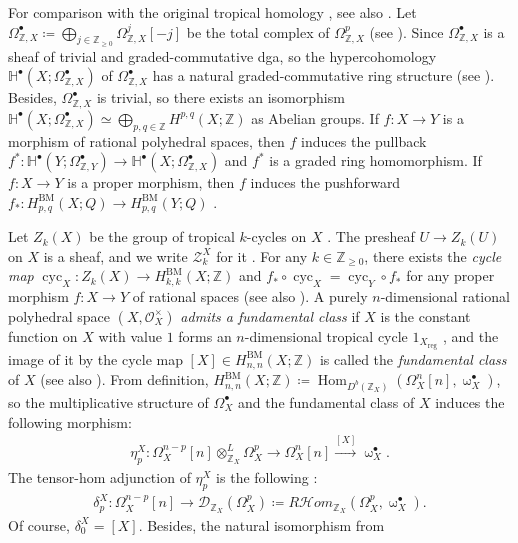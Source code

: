 \documentclass[a4paper,dvipdfmx,reqno,12pt]{amsart}
\theoremstyle{definition}
\newcommand{\deq}{\coloneqq}
\newcommand{\opn}[1]{\operatorname{#1}}
\newcommand{\xto}[1]{\xrightarrow{#1}}
\numberwithin{equation}{section}
\begin{document}
For comparison with the original
tropical homology \cite{MR3330789,MR3961331},
see also \cite[Remark 2.8 and Theorem 4.20]{MR4637248}.
Let $\Omega_{\mathbb{Z},X}^{\bullet}
\deq \bigoplus_{j\in \mathbb{Z}_{\geq 0}}
\Omega_{\mathbb{Z},X}^{j}[-j]$ 
be the total complex of 
$\Omega_{\mathbb{Z},X}^{p}$ 
(see \cite[Proposition 3.1]{smacka2017differential}).
Since $\Omega_{\mathbb{Z},X}^{\bullet}$ is a sheaf
of trivial and graded-commutative dga, so the
hypercohomology 
$\mathbb{H}^{\bullet}(X;\Omega_{\mathbb{Z},X}^{\bullet})$
of $\Omega_{\mathbb{Z},X}^{\bullet}$ has
a natural graded-commutative ring structure
(see \cite[Remark 21.130]{gortzwedhorn2023}).
Besides, $\Omega_{\mathbb{Z},X}^{\bullet}$ is trivial,
so there exists an isomorphism
$\mathbb{H}^{\bullet}(X;\Omega_{\mathbb{Z},X}^{\bullet})
\simeq \bigoplus_{p,q\in \mathbb{Z}}
H^{p,q}(X;\mathbb{Z})$ as Abelian groups.
If $f\colon X\to Y$ is a morphism of
rational polyhedral spaces, then
$f$ induces the pullback
$f^{*}\colon \mathbb{H}^{\bullet}(Y;\Omega_{\mathbb{Z},Y}^{\bullet})
\to \mathbb{H}^{\bullet}(X;\Omega_{\mathbb{Z},X}^{\bullet})$
\cite[Proposition 4.18]{MR4637248} and $f^{*}$ is
a graded ring homomorphism.
If $f\colon X\to Y$ is a proper morphism, then
$f$ induces the pushforward 
$f_*\colon H^{\opn{BM}}_{p,q}(X;Q)\to 
H^{\opn{BM}}_{p,q}(Y;Q)$ \cite[Definition 4.9]{MR4637248}.

Let $Z_k(X)$ be the group of tropical $k$-cycles
on $X$ \cite[Definition 3.5]{MR4637248}.
The presheaf $U\to Z_k(U)$ on $X$ is a sheaf,
and we write $\mathscr{Z}_k^{X}$ for it
\cite[p.591]{MR4637248}.
For any $k\in \mathbb{Z}_{\geq 0}$, there
exists the \emph{cycle map}
$\opn{cyc}_X \colon Z_k(X)\to 
H^{\mathrm{BM}}_{k,k}(X;\mathbb{Z})$
and $f_*\circ \opn{cyc}_X=\opn{cyc}_Y \circ f_*$
for any proper morphism $f\colon X\to Y$ of rational
spaces \cite[Definition 5.4 and Corollary 5.8]{MR4637248}
(see also \cite[Definition 4.13]{MR3894860}).
A purely $n$-dimensional rational polyhedral space
$(X,\mathcal{O}_X^{\times})$
\emph{admits a fundamental class} if
$X$ is the constant function on 
$X$ with value $1$ forms
an $n$-dimensional tropical cycle
$1_{X_{\mathrm{reg}}}$
\cite[]{MR4637248},
and the image of it by the cycle map
$[X]\in H_{n,n}^{\mathrm{BM}}(X;\mathbb{Z})$ 
is called the \emph{fundamental class} of $X$
(see also \cite[Definition 4.8]{MR3894860}).
From definition,
$H_{n,n}^{\mathrm{BM}}
(X;\mathbb{Z})\deq \opn{Hom}_{D^{b}(\mathbb{Z}_X)}
(\Omega_{X}^{n}[n],\upomega_{X}^{\bullet})$, so
the multiplicative structure of $\Omega_X^{\bullet}$
and the fundamental class of $X$ induces
the following morphism:
\begin{align}
\eta_{p}^{X}\colon \Omega_X^{n-p}[n]\otimes^{L}_{\mathbb{Z}_X}
\Omega_X^{p} \to \Omega_X^{n}[n] \xto{[X]}
\upomega_X^{\bullet}. 	
\end{align}
The tensor-hom adjunction of $\eta_{p}^{X}$ is
the following \cite[p.627]{MR4637248}:
\begin{align}
\delta_p^{X}\colon \Omega_X^{n-p}[n]\to 
\mathcal{D}_{\mathbb{Z}_X}(\Omega_X^{p})
\deq R\mathcal{H}om_{\mathbb{Z}_X}(\Omega_X^{p},
\upomega_X^{\bullet}).
\end{align}
Of course, $\delta_0^{X}=[X]$.
Besides, the natural isomorphism from
\end{document}

